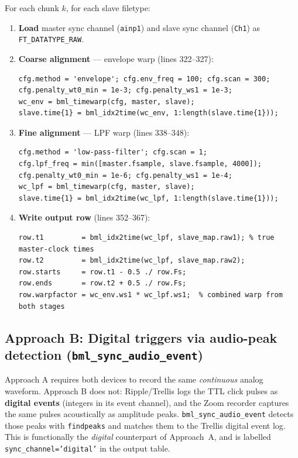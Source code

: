 \documentclass[11pt, a4paper]{article}
\begin{document}
For each chunk $k$, for each slave filetype:

\begin{enumerate}
  \item \textbf{Load} master sync channel (\texttt{ainp1}) and slave sync channel (\texttt{Ch1}) as \texttt{FT\_DATATYPE\_RAW}.
  \item \textbf{Coarse alignment} --- envelope warp (lines 322--327):
\begin{lstlisting}[style=matlab]
cfg.method = 'envelope'; cfg.env_freq = 100; cfg.scan = 300;
cfg.penalty_wt0_min = 1e-3; cfg.penalty_ws1 = 1e-3;
wc_env = bml_timewarp(cfg, master, slave);
slave.time{1} = bml_idx2time(wc_env, 1:length(slave.time{1}));
\end{lstlisting}
  \item \textbf{Fine alignment} --- LPF warp (lines 338--348):
\begin{lstlisting}[style=matlab]
cfg.method = 'low-pass-filter'; cfg.scan = 1;
cfg.lpf_freq = min([master.fsample, slave.fsample, 4000]);
cfg.penalty_wt0_min = 1e-6; cfg.penalty_ws1 = 1e-4;
wc_lpf = bml_timewarp(cfg, master, slave);
slave.time{1} = bml_idx2time(wc_lpf, 1:length(slave.time{1}));
\end{lstlisting}
  \item \textbf{Write output row} (lines 352--367):
\begin{lstlisting}[style=matlab]
row.t1         = bml_idx2time(wc_lpf, slave_map.raw1); % true master-clock times
row.t2         = bml_idx2time(wc_lpf, slave_map.raw2);
row.starts     = row.t1 - 0.5 ./ row.Fs;
row.ends       = row.t2 + 0.5 ./ row.Fs;
row.warpfactor = wc_env.ws1 * wc_lpf.ws1;  % combined warp from both stages
\end{lstlisting}
\end{enumerate}

\subsection{Approach B: Digital triggers via audio-peak detection (\texttt{bml\_sync\_audio\_event})}

Approach A requires both devices to record the same \emph{continuous} analog waveform. Approach B does not: Ripple/Trellis logs the TTL click pulses as \textbf{digital events} (integers in its event channel), and the Zoom recorder captures the same pulses acoustically as amplitude peaks. \texttt{bml\_sync\_audio\_event} detects those peaks with \texttt{findpeaks} and matches them to the Trellis digital event log. This is functionally the \emph{digital} counterpart of Approach~A, and is labelled \texttt{sync\_channel='digital'} in the output table.
\end{document}
